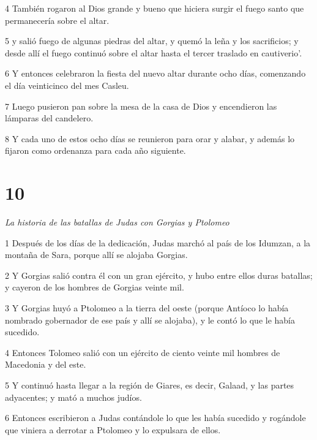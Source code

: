 \par 4 También rogaron al Dios grande y bueno que hiciera surgir el fuego santo que permanecería sobre el altar.

\par 5 y salió fuego de algunas piedras del altar, y quemó la leña y los sacrificios; y desde allí el fuego continuó sobre el altar hasta el tercer traslado en cautiverio'.

\par 6 Y entonces celebraron la fiesta del nuevo altar durante ocho días, comenzando el día veinticinco del mes Casleu.

\par 7 Luego pusieron pan sobre la mesa de la casa de Dios y encendieron las lámparas del candelero.

\par 8 Y cada uno de estos ocho días se reunieron para orar y alabar, y además lo fijaron como ordenanza para cada año siguiente.

\chapter{10}

\par \textit{La historia de las batallas de Judas con Gorgias y Ptolomeo}

\par 1 Después de los días de la dedicación, Judas marchó al país de los Idumzan, a la montaña de Sara, porque allí se alojaba Gorgias.

\par 2 Y Gorgias salió contra él con un gran ejército, y hubo entre ellos duras batallas; y cayeron de los hombres de Gorgias veinte mil.

\par 3 Y Gorgias huyó a Ptolomeo a la tierra del oeste (porque Antíoco lo había nombrado gobernador de ese país y allí se alojaba), y le contó lo que le había sucedido.

\par 4 Entonces Tolomeo salió con un ejército de ciento veinte mil hombres de Macedonia y del este.

\par 5 Y continuó hasta llegar a la región de Giares, es decir, Galaad, y las partes adyacentes; y mató a muchos judíos.

\par 6 Entonces escribieron a Judas contándole lo que les había sucedido y rogándole que viniera a derrotar a Ptolomeo y lo expulsara de ellos.

